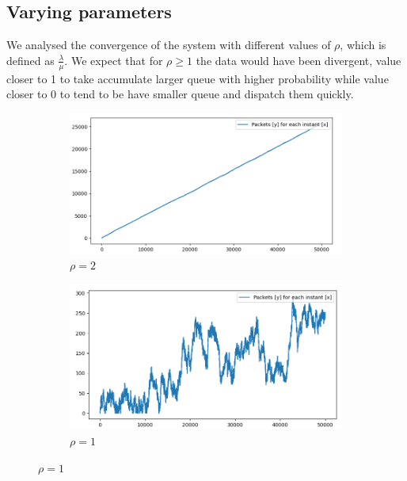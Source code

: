 \documentclass[10pt,a4paper]{article}
\begin{document}
\subsection*{Varying parameters}

We analysed the convergence of the system with different values of \(\rho\), which is defined as \(\frac \lambda \mu\). We expect that for \(\rho \ge 1\) the data would have been divergent, value closer to 1 to take accumulate larger queue with higher probability while value closer to 0 to tend to be have smaller queue and dispatch them quickly.

\begin{figure}[h]
  \begin{subfigure}[t]{.45\textwidth}
    \centering
    \includegraphics[width=\linewidth]{img/pho2}
    \caption{\(\rho = 2\)}
    \label{fig:rho2}
  \end{subfigure}
  \hfill
  \begin{subfigure}[t]{.45\textwidth}
    \centering
	\includegraphics[width=\linewidth]{img/rho1}
    \caption{\(\rho = 1\)}
	\label{fig:rho1}
  \end{subfigure}

\end{figure}
\end{document}

